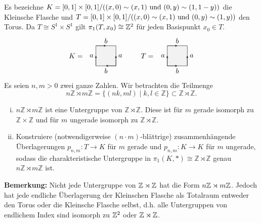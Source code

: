 \begin{aufgabe}
	Es bezeichne $K= [0,1]\times [0,1] / ((x,0)\sim (x,1)\textup{ und }(0,y) \sim (1, 1-y))$ die Kleinsche Flasche und $T= [0,1] \times [0,1] / ((x,0)\sim (x,1)\textup{ und }(0,y) \sim (1, y))$ den Torus. Da $T\cong S^1\times S^1$ gilt $\pi_1(T,x_0)\cong \mathbb Z^2$ für jeden Basispunkt $x_0\in T$. 
	\[ 
	\begin{tikzpicture}[auto, glueing/.style= {->, >=stealth}, scale = 1]
		\node at (-1, 0.5) {$K =$};
		\fill[color = gray!10] (0,0)--(0,1)--(1,1)--(1,0)--(0,0);
		\draw (0,0) to node{$a$} (0,1);\draw[glueing] (0,0) to (0,0.5);
		\draw (1,0) to node[swap]{$a$} (1,1);\draw[glueing] (1,0) to (1,0.5);
		\draw (0,0) to node[swap]{$b$} (1,0);\draw[glueing] (1,0) to (0.5,0);
		\draw (0,1) to node{$b$} (1,1);\draw[glueing] (0,1) to (0.5,1);
	\end{tikzpicture}
	\qquad
	\begin{tikzpicture}[auto, glueing/.style= {->, >=stealth}, scale = 1]
		\node at (-1, 0.5) {$T =$};
		\fill[color = gray!10] (0,0)--(0,1)--(1,1)--(1,0)--(0,0);
		\draw (0,0) to node{$a$} (0,1);\draw[glueing] (0,0) to (0,0.5);
		\draw (1,0) to node[swap]{$a$} (1,1);\draw[glueing] (1,0) to (1,0.5);
		\draw (0,0) to node[swap]{$b$} (1,0);\draw[glueing] (0,0) to (0.5,0);
		\draw (0,1) to node{$b$} (1,1);\draw[glueing] (0,1) to (0.5,1);
	\end{tikzpicture}\]
	Es seien $n, m>0$ zwei ganze Zahlen. Wir betrachten die Teilmenge 
	\[ n\mathbb Z\rtimes m\mathbb Z = \{ ( nk, ml) \mid k,l\in \mathbb Z\} \subset \mathbb Z\rtimes \mathbb Z. \]
	\begin{enumerate}[i)]
		\item $n\mathbb Z\rtimes m\mathbb Z$ ist eine Untergruppe von $\mathbb Z\rtimes \mathbb Z$. Diese ist für $m$ gerade isomorph zu $\mathbb Z\times \mathbb Z$ und für $m$ ungerade isomorph zu $\mathbb Z\rtimes \mathbb Z$.
		\item Konstruiere (notwendigerweise $(n\cdot m)$-blättrige) zusammenhängende Überlagerungen $p_{n,m}\colon T\to K$ für $m$ gerade und $p_{n,m}\colon K\to K$ für $m$ ungerade, sodass die charakteristische Untergruppe in $\pi_1(K, \ast) \cong \mathbb Z\rtimes \mathbb Z$ genau $n\mathbb Z\rtimes m\mathbb Z$ ist.
	\end{enumerate}
	\textbf{Bemerkung:}
		Nicht jede Untergruppe von $\mathbb Z\rtimes\mathbb Z$ hat die Form $n\mathbb Z\rtimes m\mathbb Z$. Jedoch hat jede endliche Überlagerung der Kleinschen Flasche als Totalraum entweder den Torus oder die Kleinsche Flasche selbst, d.h. alle Untergruppen von endlichem Index sind isomorph zu $\mathbb Z^2$ oder $\mathbb Z\rtimes\mathbb Z$.
\end{aufgabe}

